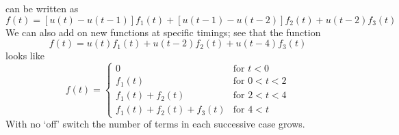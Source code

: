 \documentclass{report}
\begin{document}
can be written as
\begin{equation*}
f(t)=[u(t)-u(t-1)]f_1(t)+[u(t-1)-u(t-2)]f_2(t)
+u(t-2)f_3(t)
\end{equation*}
We can also add on new functions at specific timings; see that the function
\begin{equation*}
f(t)=u(t)f_1(t)+u(t-2)f_2(t)+u(t-4)f_3(t)
\end{equation*}
looks like
\begin{equation*}
f(t)=\begin{cases}
0&\text{for }t<0\\
f_1(t)&\text{for }0<t<2\\
f_1(t)+f_2(t)&\text{for }2<t<4\\
f_1(t)+f_2(t)+f_3(t)&\text{for }4<t
\end{cases}
\end{equation*}
With no `off' switch the number of terms in each successive case grows.
\newpage
\end{document}

